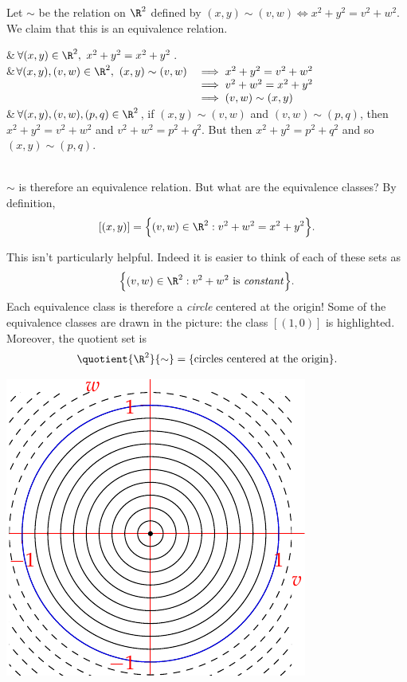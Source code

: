 \begin{example}\label{ex:equivcircle}
Let $\sim$ be the relation on $\R^2$ defined by $(x,y)\sim(v,w)\iff x^2+y^2=v^2+w^2$. We claim that this is an equivalence relation.
	\begin{ptabular}{\trans}
		&$\forall (x,y)\in\R^2,\ x^2+y^2=x^2+y^2$.\\
		\symm&$\begin{array}[t]{@{}rl}
		\forall (x,y),(v,w)\in\R^2,\ (x,y)\sim(v,w)&\implies x^2+y^2=v^2+w^2\\
		&\implies v^2+w^2=x^2+y^2\\
		&\implies (v,w)\sim(x,y)
		\end{array}$\\
		\trans&$\forall (x,y),(v,w),(p,q)\in\R^2$, if $(x,y)\sim (v,w)$ and $(v,w)\sim (p,q)$, then $x^2+y^2=v^2+w^2$ and $v^2+w^2=p^2+q^2$. But then $x^2+y^2=p^2+q^2$ and so $(x,y)\sim (p,q)$.
	\end{ptabular}\\
	
	$\sim$ is therefore an equivalence relation. But what are the equivalence classes? By definition,
\[[(x,y)]=\Bigl\{(v,w)\in\R^2:v^2+w^2=x^2+y^2\Bigr\}.\]
\noindent\begin{minipage}{0.6\textwidth}
This isn't particularly helpful. Indeed it is easier to think of each of these sets as
\[\Bigl\{(v,w)\in\R^2:v^2+w^2\text{ is \emph{constant}}\Bigr\}.\]
Each equivalence class is therefore a \emph{circle} centered at the origin! Some of the equivalence classes are drawn in the picture: the class $[(1,0)]$ is highlighted. Moreover, the quotient set is
\[\quotient{\R^2}{\sim}=\{\text{circles centered at the origin}\}.\]
\end{minipage}\qquad
\begin{minipage}{0.35\textwidth}
\includegraphics[width=\textwidth]{relations-24-circles}
\end{minipage}
\end{example}

